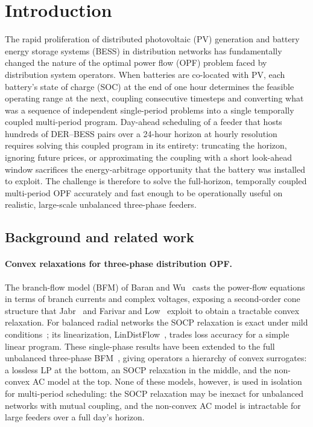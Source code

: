 
\section{Introduction}
\label{sec:intro}

The rapid proliferation of distributed photovoltaic (PV) generation and battery
energy storage systems (BESS) in distribution networks has fundamentally changed
the nature of the optimal power flow (OPF) problem faced by distribution system
operators. When batteries are co-located with PV, each battery's state of charge
(SOC) at the end of one hour determines the feasible operating range at the next,
coupling consecutive timesteps and converting what was a sequence of independent
single-period problems into a single temporally coupled multi-period program.
Day-ahead scheduling of a feeder that hosts hundreds of DER–BESS pairs over a
24-hour horizon at hourly resolution requires solving this coupled program in its
entirety: truncating the horizon, ignoring future prices, or approximating the
coupling with a short look-ahead window sacrifices the energy-arbitrage opportunity
that the battery was installed to exploit. The challenge is therefore to solve
the full-horizon, temporally coupled multi-period OPF accurately and fast enough
to be operationally useful on realistic, large-scale unbalanced three-phase feeders.

\subsection*{Background and related work}

\paragraph{Convex relaxations for three-phase distribution OPF.}
The branch-flow model (BFM) of Baran and Wu~\cite{BaWu89} casts the power-flow
equations in terms of branch currents and complex voltages, exposing a
second-order cone structure that Jabr~\cite{Jabr06} and Farivar and
Low~\cite{FaLo13} exploit to obtain a tractable convex relaxation.
For balanced radial networks the SOCP relaxation is exact under mild
conditions~\cite{FaLo13}; its linearization, LinDistFlow~\cite{BaWu89}, trades
loss accuracy for a simple linear program. These single-phase results have been
extended to the full unbalanced three-phase BFM~\cite{GaLo14,ZhLo16}, giving
operators a hierarchy of convex surrogates: a lossless LP at the bottom, an
SOCP relaxation in the middle, and the non-convex AC model at the top.
None of these models, however, is used in isolation for multi-period scheduling:
the SOCP relaxation may be inexact for unbalanced networks with mutual coupling,
and the non-convex AC model is intractable for large feeders over a full day's
horizon.

